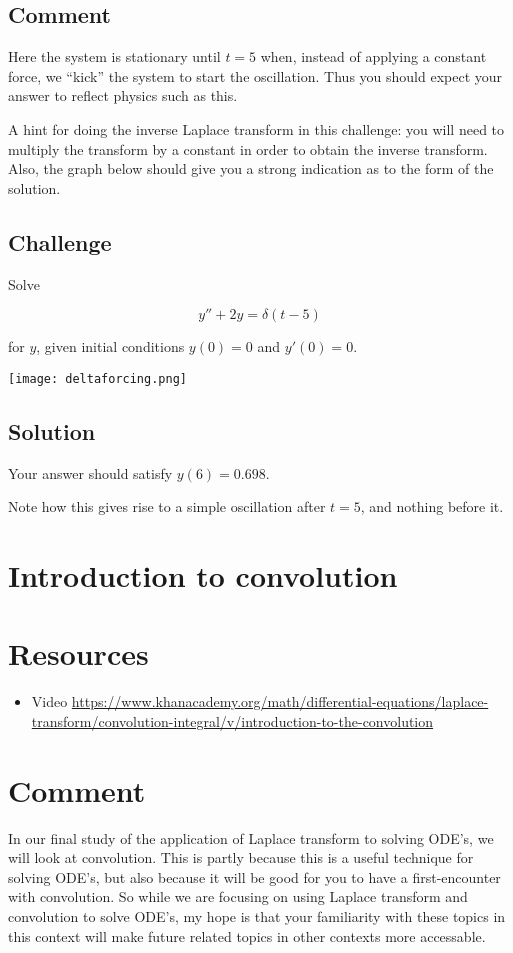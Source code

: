 \subsection*{Comment}
Here the system is stationary until $t=5$ when, instead of applying a constant force, we ``kick'' the system to start the oscillation. Thus you should expect your answer to reflect physics such as this.

A hint for doing the inverse Laplace transform in this challenge: you will need to multiply the transform by a constant in order to obtain the inverse transform. Also, the graph below should give you a strong indication as to the form of the solution.

\subsection*{Challenge}
Solve

\begin{equation}
    y''+2y=\delta(t-5)
\end{equation}

for $y$, given initial conditions $y(0)=0$ and $y'(0)=0$. 

\texttt{[image: deltaforcing.png]}

\subsection*{Solution}
Your answer should satisfy $y(6)=0.698$.

Note how this gives rise to a simple oscillation after $t=5$, and nothing before it.




\newpage
\section{Introduction to convolution}

\section*{Resources}
\begin{itemize}
    \item Video \url{https://www.khanacademy.org/math/differential-equations/laplace-transform/convolution-integral/v/introduction-to-the-convolution}
\end{itemize}

\section*{Comment}
In our final study of the application of Laplace transform to solving ODE's, we will look at convolution. This is partly because this is a useful technique for solving ODE's, but also because it will be good for you to have a first-encounter with convolution. So while we are focusing on using Laplace transform and convolution to solve ODE's, my hope is that your familiarity with these topics in this context will make future related topics in other contexts more accessable.

